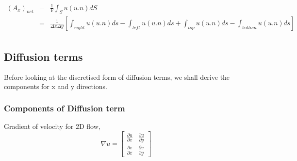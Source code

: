 \begin{eqnarray}
 (A_x)_{net} &=& \frac{1}{V}\int_S u(u.n)dS \\
	 &=& \frac{1}{\Delta x \Delta y}\left[\int_{right} u(u.n)ds - \int_{left} u(u.n)ds + \int_{top} u(u.n)ds - \int_{bottom} u(u.n)ds\right] \nonumber \\
 \end{eqnarray}
 
 \subsection{Diffusion terms}
 Before looking at the discretised form of diffusion terms, we shall derive the components for x and y directions.
 
\subsubsection{Components of Diffusion term}
Gradient of velocity for 2D flow, 
\begin{equation*}
 \nabla u =  \begin{bmatrix} \frac{\partial u}{\partial x} & \frac{\partial u}{\partial y} \\ \frac{\partial v}{\partial x} & \frac{\partial v}{\partial y}  \end{bmatrix}
\end{equation*}

